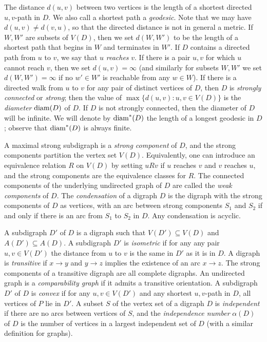\documentclass[a4paper,12pt]{article}
\theoremstyle{definition}
\newcommand{\diam}{{\rm diam}}
\begin{document}
	The distance $d(u,v)$ between two vertices is the length of a shortest directed $u,v$-path in $D$. We also call a shortest path a \emph{geodesic}. Note that we may have $d(u,v) \neq d(v,u)$, so that the directed distance is not in general a metric. If $W,W'$ are subsets of $V(D)$, then we set $d(W,W')$ to be the length of a shortest path that begins in $W$ and terminates in $W'$. If $D$ contains a directed path from $u$ to $v$, we say that $u$ \emph{reaches} $v$. If there is a pair $u,v$ for which $u$ cannot reach $v$, then we set $d(u,v) = \infty $ (and similarly for subsets $W,W'$ we set $d(W,W') = \infty $ if no $w' \in W'$ is reachable from any $w \in W$). If there is a directed walk from $u$ to $v$ for any pair of distinct vertices of $D$, then $D$ is \emph{strongly connected} or \emph{strong}; then the value of $\max \{ d(u,v):u,v \in V(D)\} $ is the \emph{diameter} $\diam (D)$ of $D$. If $D$ is not strongly connected, then the diameter of $D$ will be infinite. We will denote by $\diam ^*(D)$ the length of a longest geodesic in $D$; observe that $\diam ^*(D)$ is always finite.  
	
	A maximal strong subdigraph is a \emph{strong component} of $D$, and the strong components partition the vertex set $V(D)$. Equivalently, one can introduce an equivalence relation $R$ on $V(D)$ by setting $uRv$ if $u$ reaches $v$ and $v$ reaches $u$, and the strong components are the equivalence classes for $R$. The connected components of the underlying undirected graph of $D$ are called the \emph{weak components} of $D$. The \emph{condensation} of a digraph $D$ is the digraph with the strong components of $D$ as vertices, with an arc between strong components $S_1$ and $S_2$ if and only if there is an arc from $S_1$ to $S_2$ in $D$. Any condensation is acyclic.
	
	A subdigraph $D'$ of $D$ is a digraph such that $V(D') \subseteq V(D)$ and $A(D') \subseteq A(D)$. A subdigraph $D'$ is \emph{isometric} if for any any pair $u,v \in V(D')$ the distance from $u$ to $v$ is the same in $D'$ as it is in $D$. A digraph is \emph{transitive} if $x \rightarrow y$ and $y \rightarrow z$ implies the existence of an arc $x \rightarrow z$. The strong components of a transitive digraph are all complete digraphs. An undirected graph is a \emph{comparability graph} if it admits a transitive orientation. A subdigraph $D'$ of $D$ is \emph{convex} if for any $u,v \in V(D')$ and any shortest $u,v$-path in $D$, all vertices of $P$ lie in $D'$. A subset $S$ of the vertex set of a digraph $D$ is \emph{independent} if there are no arcs between vertices of $S$, and the \emph{independence number} $\alpha (D)$ of $D$ is the number of vertices in a largest independent set of $D$ (with a similar definition for graphs).
	
\end{document}
